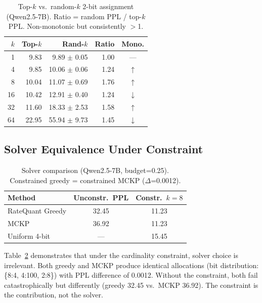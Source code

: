 \documentclass[11pt,a4paper]{article}
\begin{document}
\begin{table}[t]
\centering
\small
\begin{tabular}{rrrrc}
\toprule
$k$ & \textbf{Top-$k$} & \textbf{Rand-$k$} & \textbf{Ratio} & \textbf{Mono.} \\
\midrule
1  &  9.83 &  9.89 $\pm$ 0.05 & 1.00 & --- \\
4  &  9.85 & 10.06 $\pm$ 0.06 & 1.24 & $\uparrow$ \\
8  & 10.04 & 11.07 $\pm$ 0.69 & 1.76 & $\uparrow$ \\
16 & 10.42 & 12.91 $\pm$ 0.40 & 1.24 & $\downarrow$ \\
32 & 11.60 & 18.33 $\pm$ 2.53 & 1.58 & $\uparrow$ \\
64 & 22.95 & 55.94 $\pm$ 9.73 & 1.45 & $\downarrow$ \\
\bottomrule
\end{tabular}
\caption{Top-$k$ vs.\ random-$k$ 2-bit assignment (Qwen2.5-7B). Ratio = random PPL / top-$k$ PPL. Non-monotonic but consistently $>$1.}
\label{tab:w9}
\end{table}

\subsection{Solver Equivalence Under Constraint}
\label{sec:solver}

\begin{table}[t]
\centering
\small
\begin{tabular}{lcc}
\toprule
\textbf{Method} & \textbf{Unconstr.\ PPL} & \textbf{Constr.\ $k{=}8$} \\
\midrule
RateQuant Greedy & 32.45 & 11.23 \\
MCKP             & 36.92 & 11.23 \\
Uniform 4-bit    & ---   & 15.45 \\
\bottomrule
\end{tabular}
\caption{Solver comparison (Qwen2.5-7B, budget=0.25). Constrained greedy = constrained MCKP ($\Delta$=0.0012).}
\label{tab:solver}
\end{table}

Table~\ref{tab:solver} demonstrates that under the cardinality constraint, solver choice is irrelevant. Both greedy and MCKP produce identical allocations (bit distribution: \{8:4, 4:100, 2:8\}) with PPL difference of 0.0012. Without the constraint, both fail catastrophically but differently (greedy 32.45 vs.\ MCKP 36.92). The constraint is the contribution, not the solver.
\end{document}
